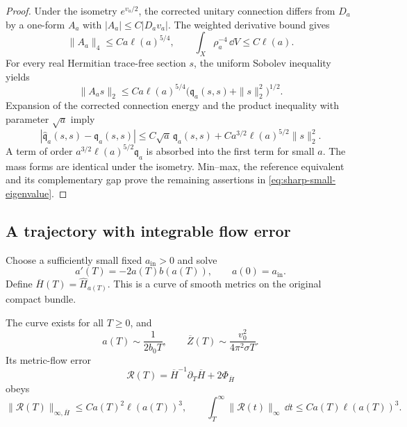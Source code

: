 \begin{proof}
Under the isometry \(e^{v_a/2}\), the corrected unitary
connection differs from \(D_a\) by a one-form \(A_a\) with
\(|A_a|\le C|D_av_a|\). The weighted derivative bound gives
\[
 \|A_a\|_4\le Ca\ell(a)^{5/4},\qquad
 \int_X\rho_a^{-4}\,\dd V\le C\ell(a).
\]
For every real Hermitian trace-free section \(s\), the
uniform Sobolev inequality yields
\[
 \|A_as\|_2
 \le Ca\ell(a)^{5/4}
       \bigl(\mathfrak q_a(s,s)+\|s\|_2^2\bigr)^{1/2}.
\]
Expansion of the corrected connection energy and the
product inequality with parameter \(\sqrt a\) imply
\begin{equation}\label{eq:corrected-form-comparison}
 |\widehat{\mathfrak q}_a(s,s)-\mathfrak q_a(s,s)|
 \le C\sqrt a\,\mathfrak q_a(s,s)
      +Ca^{3/2}\ell(a)^{5/2}\|s\|_2^2.
\end{equation}
A term of order \(a^{3/2}\ell(a)^{5/2}\mathfrak q_a\)
is absorbed into the first term for small \(a\).
The mass forms are identical under the isometry.
Min--max, the reference equivalent and its complementary
gap prove the remaining assertions in
\eqref{eq:sharp-small-eigenvalue}.
\end{proof}

\subsection{A trajectory with integrable flow error}

Choose a sufficiently small fixed \(a_{\mathrm{in}}>0\) and solve
\begin{equation}\label{eq:comparison-ode}
 a'(T)=-2a(T)b(a(T)),\qquad a(0)=a_{\mathrm{in}}.
\end{equation}
Define \(\overline H(T)=\widehat H_{a(T)}\). This is a curve
of smooth metrics on the original compact bundle.

\begin{proposition}\label{prop:comparison-trajectory}
The curve exists for all \(T\ge0\), and
\begin{equation}\label{eq:comparison-asymptotic}
 a(T)\sim\frac1{2b_0T},\qquad
 \overline Z(T)\sim\frac{v_0^2}{4\pi^2\sigma T}.
\end{equation}
Its metric-flow error
\[
 \mathcal R(T)=\overline H^{-1}\partial_T\overline H
                 +2\Phi_{\overline H}
\]
obeys
\begin{equation}\label{eq:integrable-flow-error}
 \|\mathcal R(T)\|_{\infty,\overline H}
 \le Ca(T)^2\ell(a(T))^3,\qquad
 \int_T^\infty\|\mathcal R(t)\|_\infty\,\dd t
 \le Ca(T)\ell(a(T))^3.
\end{equation}
\end{proposition}

